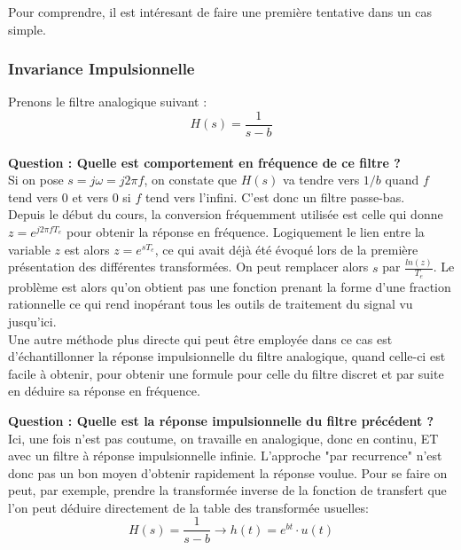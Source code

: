 \documentclass[11pt,a4paper]{article}
\begin{document}
Pour comprendre, il est intéresant de faire une première tentative dans un cas simple.

\subsubsection{Invariance Impulsionnelle}
 Prenons le filtre analogique suivant :\\
 
 \[ H(s) = \frac{1}{s-b} \]\\
 
 \textbf{Question : Quelle est comportement en fréquence de ce filtre ? }\\
 
 Si on pose $s = j\omega = j2 \pi f$, on constate que $H(s)$ va tendre vers $1/b$ quand $f$ tend vers 0 et vers $0$ si $f$ tend vers l'infini. C'est donc un filtre passe-bas.\\
 
Depuis le début du cours, la conversion fréquemment utilisée est celle qui donne $z = e^{j2 \pi fT_e }$ pour obtenir la réponse en fréquence. Logiquement le lien entre la variable $z$ est alors $z = e^{sT_e}$, ce qui avait déjà été évoqué lors de la première présentation des différentes transformées. On peut remplacer alors $s$ par $\frac{ln(z)}{T_e}$. Le problème est alors qu'on obtient pas une fonction prenant la forme d'une fraction rationnelle ce qui rend inopérant tous les outils de traitement du signal vu jusqu'ici.\\

Une autre méthode plus directe qui peut être employée dans ce cas est d'échantillonner la réponse impulsionnelle du filtre analogique, quand celle-ci est facile à obtenir, pour obtenir une formule pour celle du filtre discret et par suite en déduire sa réponse en fréquence.

 \textbf{Question : Quelle est la réponse impulsionnelle du filtre précédent ? }\\
 
 Ici, une fois n'est pas coutume, on travaille en analogique, donc en continu, ET avec un filtre à réponse impulsionnelle infinie. L'approche "par recurrence" n'est donc pas un bon moyen  d'obtenir rapidement la réponse voulue. Pour se faire on peut, par exemple, prendre la transformée inverse de la fonction de transfert que l'on peut déduire directement de la table des transformée usuelles:\\
 
\[ H(s) = \frac{1}{s-b} \rightarrow h(t) = e^{bt} \cdot u(t)  \]\\
\end{document}
